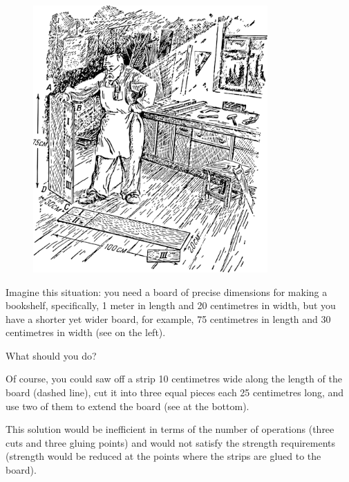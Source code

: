 \begin{figure}[h!]
\centering
\includegraphics[width=0.8\textwidth]{figures/ch-12/fig-189.pdf}
\end{figure}
 

Imagine this situation: you need a board of precise dimensions for making a bookshelf, specifically, 1 meter in length and 20 centimetres in width, but you have a shorter yet wider board, for example, 75 centimetres in length and 30 centimetres in width (see  on the left).

What should you do?


Of course, you could saw off a strip 10 centimetres wide along the length of the board (dashed line), cut it into three equal pieces each 25 centimetres long, and use two of them to extend the board (see  at the bottom).

This solution would be inefficient in terms of the number of operations (three cuts and three gluing points) and would not satisfy the strength requirements (strength would be reduced at the points where the strips are glued to the board).


